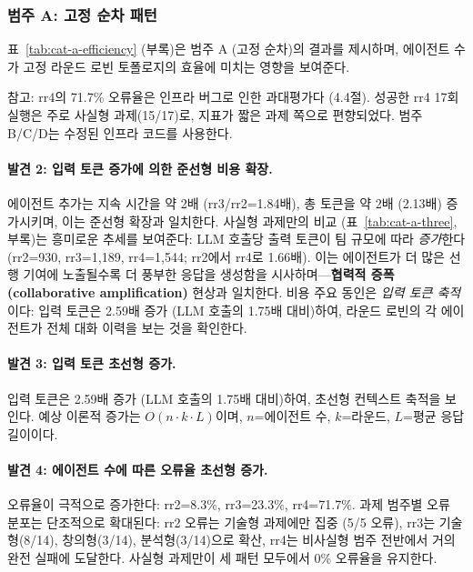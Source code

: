 \documentclass[a4paper,11pt]{article}
\begin{document}
\subsubsection{범주 A: 고정 순차 패턴}

표~\ref{tab:cat-a-efficiency} (부록)은 범주 A (고정 순차)의 결과를 제시하며, 에이전트 수가 고정 라운드 로빈 토폴로지의 효율에 미치는 영향을 보여준다.



참고: rr4의 71.7\% 오류율은 인프라 버그로 인한 과대평가다 (4.4절). 성공한 rr4 17회 실행은 주로 사실형 과제(15/17)로, 지표가 짧은 과제 쪽으로 편향되었다. 범주 B/C/D는 수정된 인프라 코드를 사용한다.

\paragraph{발견 2: 입력 토큰 증가에 의한 준선형 비용 확장.}
에이전트 추가는 지속 시간을 약 2배 (rr3/rr2=1.84배), 총 토큰을 약 2배 (2.13배) 증가시키며, 이는 준선형 확장과 일치한다. 사실형 과제만의 비교 (표~\ref{tab:cat-a-three}, 부록)는 흥미로운 추세를 보여준다: LLM 호출당 출력 토큰이 팀 규모에 따라 \emph{증가}한다 (rr2=930, rr3=1,189, rr4=1,544; rr2에서 rr4로 1.66배). 이는 에이전트가 더 많은 선행 기여에 노출될수록 더 풍부한 응답을 생성함을 시사하며---\textbf{협력적 증폭(collaborative amplification)} 현상과 일치한다. 비용 주요 동인은 \emph{입력 토큰 축적}이다: 입력 토큰은 2.59배 증가 (LLM 호출의 1.75배 대비)하여, 라운드 로빈의 각 에이전트가 전체 대화 이력을 보는 것을 확인한다.

\paragraph{발견 3: 입력 토큰 초선형 증가.}
입력 토큰은 2.59배 증가 (LLM 호출의 1.75배 대비)하여, 초선형 컨텍스트 축적을 보인다. 예상 이론적 증가는 $O(n \cdot k \cdot L)$이며, $n$=에이전트 수, $k$=라운드, $L$=평균 응답 길이이다.

\paragraph{발견 4: 에이전트 수에 따른 오류율 초선형 증가.}
오류율이 극적으로 증가한다: rr2=8.3\%, rr3=23.3\%, rr4=71.7\%. 과제 범주별 오류 분포는 단조적으로 확대된다: rr2 오류는 기술형 과제에만 집중 (5/5 오류), rr3는 기술형(8/14), 창의형(3/14), 분석형(3/14)으로 확산, rr4는 비사실형 범주 전반에서 거의 완전 실패에 도달한다. 사실형 과제만이 세 패턴 모두에서 0\% 오류율을 유지한다.
\end{document}

